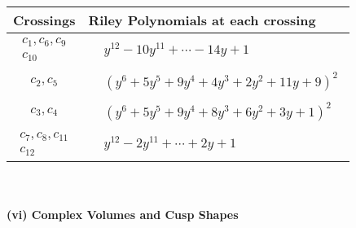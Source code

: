\documentclass[1p]{elsarticle_modified}
\theoremstyle{definition}
\begin{document}
\begin{tabular}{m{50pt}|m{274pt}}
Crossings & \hspace{64pt}Riley Polynomials at each crossing \\
\hline $$\begin{aligned}c_{1},c_{6},c_{9}\\c_{10}\end{aligned}$$&$\begin{aligned}
&y^{12}-10 y^{11}+\cdots-14 y+1
\end{aligned}$\\
\hline $$\begin{aligned}c_{2},c_{5}\end{aligned}$$&$\begin{aligned}
&(y^6+5 y^5+9 y^4+4 y^3+2 y^2+11 y+9)^2
\end{aligned}$\\
\hline $$\begin{aligned}c_{3},c_{4}\end{aligned}$$&$\begin{aligned}
&(y^6+5 y^5+9 y^4+8 y^3+6 y^2+3 y+1)^2
\end{aligned}$\\
\hline $$\begin{aligned}c_{7},c_{8},c_{11}\\c_{12}\end{aligned}$$&$\begin{aligned}
&y^{12}-2 y^{11}+\cdots+2 y+1
\end{aligned}$\\
\hline
\end{tabular}\\~\\
\newpage\flushleft \textbf{(vi) Complex Volumes and Cusp Shapes}
\end{document}

